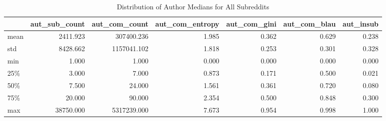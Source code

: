 \begin{table}
\centering
\begin{tabular}{lrrrrrr}
\toprule
{} &  aut\_sub\_count &  aut\_com\_count &  aut\_com\_entropy &  aut\_com\_gini &  aut\_com\_blau &  aut\_insub \\
\midrule
mean &       2411.923 &     307400.236 &            1.985 &         0.362 &         0.629 &      0.238 \\
std  &       8428.662 &    1157041.102 &            1.818 &         0.253 &         0.301 &      0.328 \\
min  &          1.000 &          1.000 &            0.000 &         0.000 &         0.000 &      0.000 \\
25\%  &          3.000 &          7.000 &            0.873 &         0.171 &         0.500 &      0.021 \\
50\%  &          7.500 &         24.000 &            1.561 &         0.361 &         0.720 &      0.080 \\
75\%  &         20.000 &         90.000 &            2.354 &         0.500 &         0.848 &      0.300 \\
max  &      38750.000 &    5317239.000 &            7.673 &         0.954 &         0.998 &      1.000 \\
\bottomrule
\end{tabular}
\caption{Distribution of Author Medians for All Subreddits}
\label{table/author-medians:all}
\end{table}